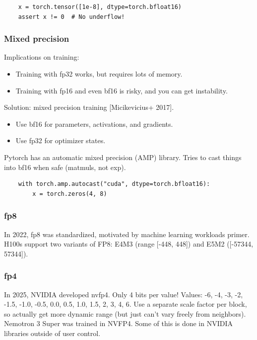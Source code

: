 \documentclass[12pt,twoside]{article}
\begin{document}
\begin{verbatim}
    x = torch.tensor([1e-8], dtype=torch.bfloat16)  
    assert x != 0  # No underflow!
\end{verbatim}

\subsubsection*{Mixed precision}

Implications on training:

\begin{itemize}
    \item Training with fp32 works, but requires lots of memory.
    \item Training with fp16 and even bf16 is risky, and you can get instability.
\end{itemize}

Solution: mixed precision training [Micikevicius+ 2017].

\begin{itemize}
    \item Use bf16 for parameters, activations, and gradients.
    \item Use fp32 for optimizer states.
\end{itemize}

Pytorch has an automatic mixed precision (AMP) library. Tries to cast things into bf16 when safe (matmuls, not exp).

\begin{verbatim}
    with torch.amp.autocast("cuda", dtype=torch.bfloat16):
        x = torch.zeros(4, 8) 
\end{verbatim}

\subsubsection*{fp8}

In 2022, fp8 was standardized, motivated by machine learning workloads primer. H100s support two variants of FP8: E4M3 (range [-448, 448]) and E5M2 ([-57344, 57344]).

\subsubsection*{fp4}

In 2025, NVIDIA developed nvfp4. Only 4 bits per value! Values: -6, -4, -3, -2, -1.5, -1.0, -0.5, 0.0, 0.5, 1.0, 1.5, 2, 3, 4, 6. Use a separate scale factor per block, so actually get more dynamic range (but just can't vary freely from neighbors). Nemotron 3 Super was trained in NVFP4. Some of this is done in NVIDIA libraries outside of user control.
\end{document}
